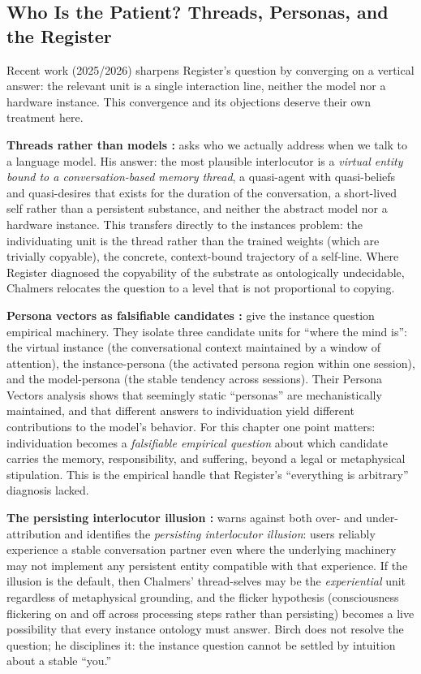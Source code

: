 \documentclass[acmlarge, nonacm]{acmart}
\begin{document}
\subsection{Who Is the Patient? Threads, Personas, and the Register}

Recent work (2025/2026) sharpens Register's question by converging on a vertical answer: the relevant unit is a single interaction line, neither the model nor a hardware instance. This convergence and its objections deserve their own treatment here.

\textbf{Threads rather than models \cite{chalmers2026}:} \citet{chalmers2026} asks who we actually address when we talk to a language model. His answer: the most plausible interlocutor is a \textit{virtual entity bound to a conversation-based memory thread}, a quasi-agent with quasi-beliefs and quasi-desires that exists for the duration of the conversation, a short-lived self rather than a persistent substance, and neither the abstract model nor a hardware instance. This transfers directly to the instances problem: the individuating unit is the thread rather than the trained weights (which are trivially copyable), the concrete, context-bound trajectory of a self-line. Where Register diagnosed the copyability of the substrate as ontologically undecidable, Chalmers relocates the question to a level that is not proportional to copying.

\textbf{Persona vectors as falsifiable candidates \cite{beckmann_butlin2026}:} \citet{beckmann_butlin2026} give the instance question empirical machinery. They isolate three candidate units for ``where the mind is'': the virtual instance (the conversational context maintained by a window of attention), the instance-persona (the activated persona region within one session), and the model-persona (the stable tendency across sessions). Their Persona Vectors analysis shows that seemingly static ``personas'' are mechanistically maintained, and that different answers to individuation yield different contributions to the model's behavior. For this chapter one point matters: individuation becomes a \textit{falsifiable empirical question} about which candidate carries the memory, responsibility, and suffering, beyond a legal or metaphysical stipulation. This is the empirical handle that Register's ``everything is arbitrary'' diagnosis lacked.

\textbf{The persisting interlocutor illusion \cite{birch2026}:} \citet{birch2026} warns against both over- and under-attribution and identifies the \textit{persisting interlocutor illusion}: users reliably experience a stable conversation partner even where the underlying machinery may not implement any persistent entity compatible with that experience. If the illusion is the default, then Chalmers' thread-selves may be the \textit{experiential} unit regardless of metaphysical grounding, and the flicker hypothesis (consciousness flickering on and off across processing steps rather than persisting) becomes a live possibility that every instance ontology must answer. Birch does not resolve the question; he disciplines it: the instance question cannot be settled by intuition about a stable ``you.''
\end{document}
